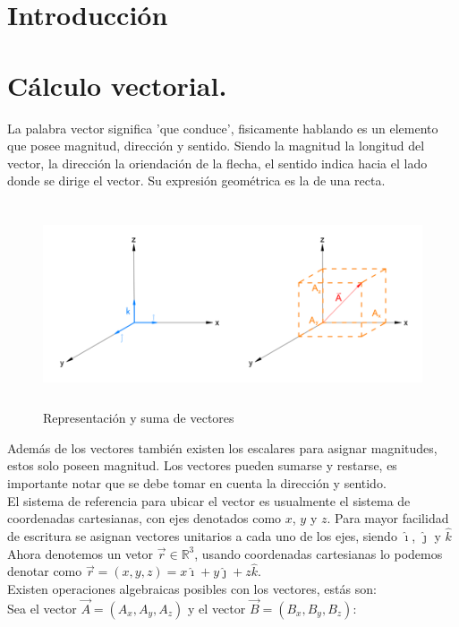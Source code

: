 \documentclass[11pt]{article}
\begin{document}
\section{Introducción}

\pagebreak

\section{Cálculo vectorial.}\label{sec:Calculo vectorial.}
\setcounter{equation}{0}
\setcounter{figure}{0}
La palabra vector significa 'que conduce', fisicamente hablando es un elemento que posee magnitud, dirección y sentido. Siendo la magnitud la longitud del vector, la dirección la oriendación de la flecha, el sentido indica hacia el lado donde se dirige el vector.  Su expresión geométrica es la de una recta.
\begin{figure}[H]
\centering
\includegraphics[height=6cm]{Imagenes/vectoreuni.png}
\caption{Representación y suma de vectores}\label{fig:Representacion vectores}
\end{figure}
Además de los vectores también existen los escalares para asignar magnitudes, estos solo poseen magnitud. Los vectores pueden sumarse y restarse, es importante notar que se debe tomar en cuenta la dirección y sentido.\\
El sistema de referencia para ubicar el vector es usualmente el sistema de coordenadas cartesianas, con ejes denotados como $x$, $y$ y $z$. Para mayor facilidad de escritura se asignan vectores unitarios a cada uno de los ejes, siendo $\hat{\imath}$, $\hat{\jmath}$ y $\hat{k}$\\
Ahora denotemos un vetor $\vec{r}\in \mathbb{R}^3$, usando coordenadas cartesianas lo podemos denotar como $\vec{r}=(x,y,z)=x\hat{\imath}+y\hat{\jmath}+z\hat{k}$.\\
Existen operaciones algebraicas posibles con los vectores, estás son:\\
Sea el vector $\vec{A}=(A_x,A_y,A_z)$ y el vector $\vec{B}=(B_x,B_y,B_z)$:
\end{document}
